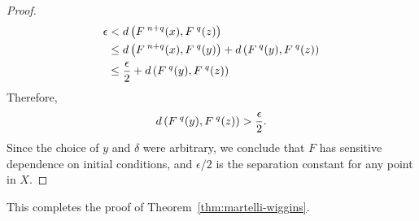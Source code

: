 \documentclass[10pt,draft,twoside]{book}
\begin{document}
\begin{proposition}
\begin{proof}
\begin{align*}
      \epsilon &< d\left( F^{\;n+q}(x), F^{\;q}(z) \right) \\
      &\leq d\left( F^{\;n+q}(x), F^{\;q}(y) \right) + d\left( F^{\;q}(y), F^{\;q}(z) \right)  \\
      &\leq \frac{\epsilon}{2} + d\left( F^{\;q}(y), F^{\;q}(z) \right)
    \end{align*}
    Therefore,
    \begin{equation*}
      d\left( F^{\;q}(y), F^{\;q}(z) \right) > \frac{\epsilon}{2}.
    \end{equation*}
    Since the choice of $y$ and $\delta$ were arbitrary, we conclude that $F$ has sensitive dependence on initial conditions, and $\epsilon/2$ is the separation constant for any point in $X$.
  \end{proof}
\end{proposition}
This completes the proof of Theorem~\ref{thm:martelli-wiggins}.



%




\printindex
\end{document}
